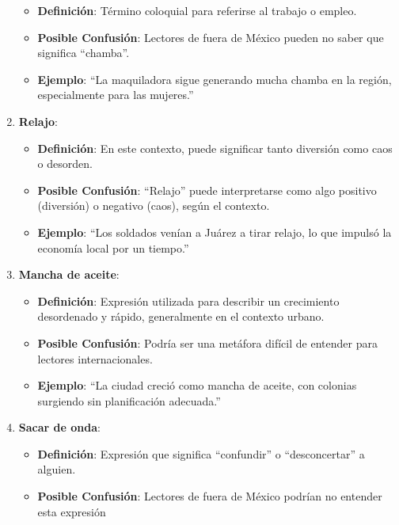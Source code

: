 \documentclass[
  10pt,
  letterpaper,
]{book}
\providecommand{\tightlist}{%
  \setlength{\itemsep}{0pt}\setlength{\parskip}{0pt}}\usepackage{longtable,booktabs,array}
\begin{document}
\begin{enumerate}
  \begin{itemize}
  \tightlist
  \item
    \textbf{Definición}: Término coloquial para referirse al trabajo o
    empleo.
  \item
    \textbf{Posible Confusión}: Lectores de fuera de México pueden no
    saber que significa ``chamba''.
  \item
    \textbf{Ejemplo}: ``La maquiladora sigue generando mucha chamba en
    la región, especialmente para las mujeres.''
  \end{itemize}
\item
  \textbf{Relajo}:

  \begin{itemize}
  \tightlist
  \item
    \textbf{Definición}: En este contexto, puede significar tanto
    diversión como caos o desorden.
  \item
    \textbf{Posible Confusión}: ``Relajo'' puede interpretarse como algo
    positivo (diversión) o negativo (caos), según el contexto.
  \item
    \textbf{Ejemplo}: ``Los soldados venían a Juárez a tirar relajo, lo
    que impulsó la economía local por un tiempo.''
  \end{itemize}
\item
  \textbf{Mancha de aceite}:

  \begin{itemize}
  \tightlist
  \item
    \textbf{Definición}: Expresión utilizada para describir un
    crecimiento desordenado y rápido, generalmente en el contexto
    urbano.
  \item
    \textbf{Posible Confusión}: Podría ser una metáfora difícil de
    entender para lectores internacionales.
  \item
    \textbf{Ejemplo}: ``La ciudad creció como mancha de aceite, con
    colonias surgiendo sin planificación adecuada.''
  \end{itemize}
\item
  \textbf{Sacar de onda}:

  \begin{itemize}
  \tightlist
  \item
    \textbf{Definición}: Expresión que significa ``confundir'' o
    ``desconcertar'' a alguien.
  \item
    \textbf{Posible Confusión}: Lectores de fuera de México podrían no
    entender esta expresión
  \end{itemize}
\end{enumerate}
\end{document}
